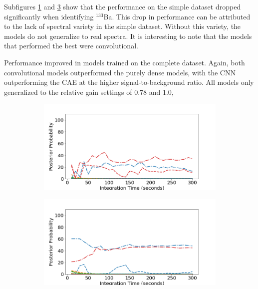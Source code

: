 Subfigures \ref{fig:realspectra-cal-ba133-0-easy} and \ref{fig:realspectra-cal-ba133-1-easy} show that the performance on the simple dataset dropped significantly when identifying $^{133}$Ba. This drop in performance can be attributed to the lack of spectral variety in the simple dataset. Without this variety, the models do not generalize to real spectra. It is interesting to note that the models that performed the best were convolutional. 

Performance improved in models trained on the complete dataset. Again, both convolutional models outperformed the purely dense models, with the CNN outperforming the CAE at the higher signal-to-background ratio. All models only generalized to the relative gain settings of 0.78 and 1.0,  



\begin{figure}[H]
     \centering
     \begin{subfigure}[b]{0.49\textwidth}
         \centering
         \includegraphics[width=\textwidth]{images/realspectra-cal-ba133-0-easy.png}
         \caption{}
         \label{fig:realspectra-cal-ba133-0-easy}
     \end{subfigure}
     \hfill
     \begin{subfigure}[b]{0.49\textwidth}
         \centering
         \includegraphics[width=\textwidth]{images/realspectra-cal-ba133-1-easy.png}
         \caption{}
         \label{fig:realspectra-cal-ba133-1-easy}
     \end{subfigure}


\end{figure}
